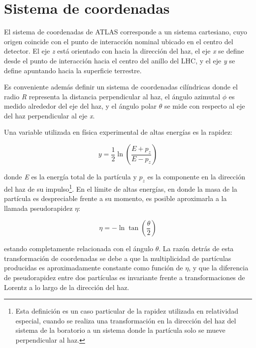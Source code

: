 \section{Sistema de coordenadas}

El sistema de coordenadas de ATLAS corresponde a un sistema cartesiano, cuyo origen coincide con el punto de interacción nominal ubicado en el centro del detector. El eje \textit{z} está orientado con hacia la dirección del haz, el eje \textit{x} se define desde el punto de interacción hacia el centro del anillo del LHC, y el eje \textit{y} se define apuntando hacia la superficie terrestre.

Es conveniente además definir un sistema de coordenadas cilíndricas donde el radio \textit{R} representa la distancia perpendicular al haz, el ángulo azimutal $\phi$ es medido alrededor del eje del haz, y el ángulo polar $\theta$ se mide con respecto al eje del haz perpendicular al eje \textit{x}. 

Una variable utilizada en física experimental de altas energías es la rapidez:

\begin{equation}
y=\frac{1}{2}\ln\left( \frac{E+p_{z}}{E-p_{z}}\right)
\end{equation}

\noindent
donde \textit{E} es la energía total de la partícula y $p_{z}$ es la componente en la dirección del haz de su impulso\footnote{Esta definición es un caso particular de la rapidez utilizada en relatividad especial, cuando se realiza una transformación en la dirección del haz del sistema de la boratorio a un sistema donde la partícula solo se mueve perpendicular al haz.}. En el límite de altas energías, en donde la masa de la partícula es despreciable frente a su momento, es posible aproximarla a la llamada pseudorapidez $\eta$:

\begin{equation}
\eta =-\ln \tan\left( \frac{\theta}{2} \right)
\end{equation}

\noindent
estando completamente relacionada con el ángulo $\theta$. La razón detrás de esta transformación de coordenadas se debe a que la multiplicidad de partículas producidas es aproximadamente constante como función de $\eta$, y que la diferencia de pseudorapidez entre dos partículas es invariante frente a transformaciones de Lorentz a lo largo de la dirección del haz. 


